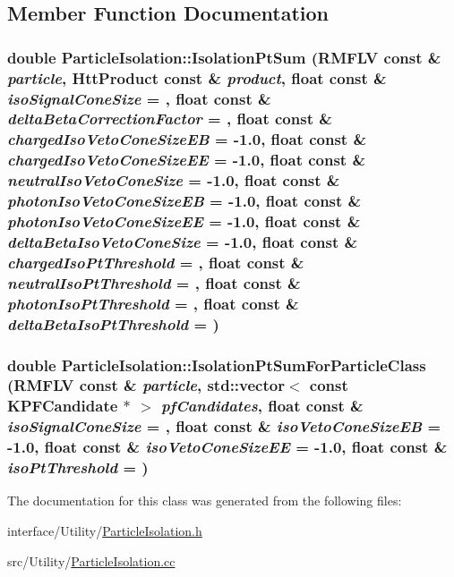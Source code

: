\subsection{Member Function Documentation}
\hypertarget{classParticleIsolation_a4b20bab9ea810932c7373be4cea97fe7}{
\subsubsection[{IsolationPtSum}]{\setlength{\rightskip}{0pt plus 5cm}double ParticleIsolation::IsolationPtSum (RMFLV const \& {\em particle}, \/  {\bf HttProduct} const \& {\em product}, \/  float const \& {\em isoSignalConeSize} = {}, \/  float const \& {\em deltaBetaCorrectionFactor} = {}, \/  float const \& {\em chargedIsoVetoConeSizeEB} = {\ttfamily -\/1.0}, \/  float const \& {\em chargedIsoVetoConeSizeEE} = {\ttfamily -\/1.0}, \/  float const \& {\em neutralIsoVetoConeSize} = {\ttfamily -\/1.0}, \/  float const \& {\em photonIsoVetoConeSizeEB} = {\ttfamily -\/1.0}, \/  float const \& {\em photonIsoVetoConeSizeEE} = {\ttfamily -\/1.0}, \/  float const \& {\em deltaBetaIsoVetoConeSize} = {\ttfamily -\/1.0}, \/  float const \& {\em chargedIsoPtThreshold} = {}, \/  float const \& {\em neutralIsoPtThreshold} = {}, \/  float const \& {\em photonIsoPtThreshold} = {}, \/  float const \& {\em deltaBetaIsoPtThreshold} = {})}}
\label{classParticleIsolation_a4b20bab9ea810932c7373be4cea97fe7}
\hypertarget{classParticleIsolation_a7f985068c1510e793431217e73f1d4b2}{
\subsubsection[{IsolationPtSumForParticleClass}]{\setlength{\rightskip}{0pt plus 5cm}double ParticleIsolation::IsolationPtSumForParticleClass (RMFLV const \& {\em particle}, \/  std::vector$<$ const KPFCandidate $\ast$ $>$ {\em pfCandidates}, \/  float const \& {\em isoSignalConeSize} = {}, \/  float const \& {\em isoVetoConeSizeEB} = {\ttfamily -\/1.0}, \/  float const \& {\em isoVetoConeSizeEE} = {\ttfamily -\/1.0}, \/  float const \& {\em isoPtThreshold} = {})}}
\label{classParticleIsolation_a7f985068c1510e793431217e73f1d4b2}


The documentation for this class was generated from the following files:\begin{DoxyCompactItemize}
\item 
interface/Utility/\hyperlink{ParticleIsolation_8h}{ParticleIsolation.h}\item 
src/Utility/\hyperlink{ParticleIsolation_8cc}{ParticleIsolation.cc}\end{DoxyCompactItemize}
